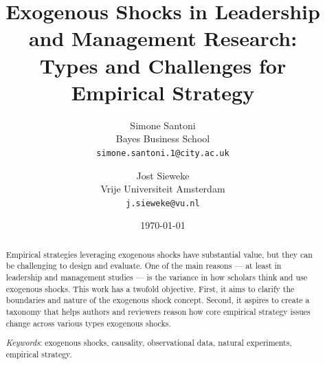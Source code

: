 \documentclass[11pt]{article}
\title{Exogenous Shocks in Leadership and Management Research:\\ 
Types and Challenges for Empirical Strategy\vspace{2em}}
\author{
  Simone Santoni\\
  Bayes Business School\\ 
  \texttt{simone.santoni.1@city.ac.uk}
  \and
  Jost Sieweke\\
  Vrije Universiteit Amsterdam\\
  \texttt{j.sieweke@vu.nl}
}
\date{
  \vspace{1em} \normalsize \today \vspace{1em} \\ 
  }
\begin{document}
\begin{singlespace}

\maketitle

\begin{abstract}
  Empirical strategies leveraging exogenous shocks have substantial value, but
  they can be challenging to design and evaluate. One of the main reasons --- at
  least in leadership and management studies --- is the variance in how scholars
  think and use exogenous shocks. This work has a twofold objective. First, it
  aims to clarify the boundaries and nature of the exogenous shock concept.
  Second, it aspires to create a taxonomy that helps authors and reviewers
  reason how core empirical strategy issues change across various types
  exogenous shocks.
  \bigskip
  
  \textit{Keywords}: exogenous shocks, causality, observational data, 
  natural experiments, empirical strategy.

\end{abstract}

\end{singlespace}

\clearpage
\end{document}
